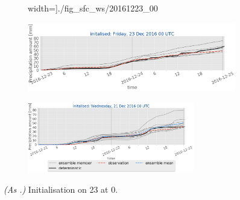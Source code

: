 \begin{figure}[H]
\begin{subfigure}[b]{0.93\textwidth}
		width=\textwidth]{./fig_sfc_ws/20161223_00}
		\caption{}\label{fig:res:sfc_ws23}
	\end{subfigure}
	\begin{subfigure}[b]{0.93\textwidth}
		\includegraphics[trim={0.cm 1.5cm 0cm 0cm},clip,
		width=\textwidth]{./fig_sfc_precip/20161223_00}
		\caption{}\label{fig:res:sfc_precip23}
	\end{subfigure}
	\begin{subfigure}[b]{\textwidth}
		\centering
		\includegraphics[trim={5.5cm 0cm 5.cm 17.7cm},clip,
		width=0.8\textwidth]{./fig_sfc_precip/20161221_00_label}
	\end{subfigure}
	\caption{\textit{(As .)} Initialisation on \SI{23}{\dec} at \SI{0}{\UTC}. }\label{fig:obs_meps:23}
\end{figure}
